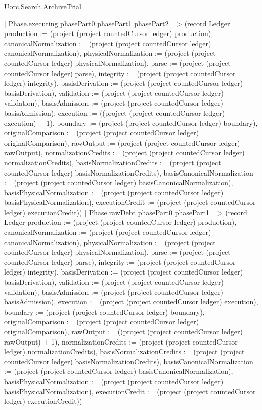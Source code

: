 \begin{lexlean}{Uorc.Search.ArchiveTrial}
\begin{semanticmodule}
{{      | Phase.executing phasePart0 phasePart1 phasePart2 => (record Ledger {production := (project (project countedCursor ledger) production), canonicalNormalization := (project (project countedCursor ledger) canonicalNormalization), physicalNormalization := (project (project countedCursor ledger) physicalNormalization), parse := (project (project countedCursor ledger) parse), integrity := (project (project countedCursor ledger) integrity), basisDerivation := (project (project countedCursor ledger) basisDerivation), validation := (project (project countedCursor ledger) validation), basisAdmission := (project (project countedCursor ledger) basisAdmission), execution := ((project (project countedCursor ledger) execution) + 1), boundary := (project (project countedCursor ledger) boundary), originalComparison := (project (project countedCursor ledger) originalComparison), rawOutput := (project (project countedCursor ledger) rawOutput), normalizationCredits := (project (project countedCursor ledger) normalizationCredits), basisNormalizationCredits := (project (project countedCursor ledger) basisNormalizationCredits), basisCanonicalNormalization := (project (project countedCursor ledger) basisCanonicalNormalization), basisPhysicalNormalization := (project (project countedCursor ledger) basisPhysicalNormalization), executionCredit := (project (project countedCursor ledger) executionCredit)})
      | Phase.rawDebt phasePart0 phasePart1 => (record Ledger {production := (project (project countedCursor ledger) production), canonicalNormalization := (project (project countedCursor ledger) canonicalNormalization), physicalNormalization := (project (project countedCursor ledger) physicalNormalization), parse := (project (project countedCursor ledger) parse), integrity := (project (project countedCursor ledger) integrity), basisDerivation := (project (project countedCursor ledger) basisDerivation), validation := (project (project countedCursor ledger) validation), basisAdmission := (project (project countedCursor ledger) basisAdmission), execution := (project (project countedCursor ledger) execution), boundary := (project (project countedCursor ledger) boundary), originalComparison := (project (project countedCursor ledger) originalComparison), rawOutput := ((project (project countedCursor ledger) rawOutput) + 1), normalizationCredits := (project (project countedCursor ledger) normalizationCredits), basisNormalizationCredits := (project (project countedCursor ledger) basisNormalizationCredits), basisCanonicalNormalization := (project (project countedCursor ledger) basisCanonicalNormalization), basisPhysicalNormalization := (project (project countedCursor ledger) basisPhysicalNormalization), executionCredit := (project (project countedCursor ledger) executionCredit)})
}}
\end{semanticmodule}
\end{lexlean}
